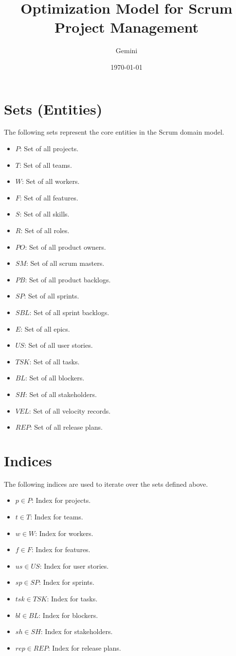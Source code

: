 \documentclass{article}
\title{Optimization Model for Scrum Project Management}
\author{Gemini}
\date{\today}
\begin{document}
\maketitle
\tableofcontents
\newpage

\section{Sets (Entities)}
The following sets represent the core entities in the Scrum domain model.
\begin{itemize}
    \item $P$: Set of all projects.
    \item $T$: Set of all teams.
    \item $W$: Set of all workers.
    \item $F$: Set of all features.
    \item $S$: Set of all skills.
    \item $R$: Set of all roles.
    \item $PO$: Set of all product owners.
    \item $SM$: Set of all scrum masters.
    \item $PB$: Set of all product backlogs.
    \item $SP$: Set of all sprints.
    \item $SBL$: Set of all sprint backlogs.
    \item $E$: Set of all epics.
    \item $US$: Set of all user stories.
    \item $TSK$: Set of all tasks.
    \item $BL$: Set of all blockers.
    \item $SH$: Set of all stakeholders.
    \item $VEL$: Set of all velocity records.
    \item $REP$: Set of all release plans.
\end{itemize}

\section{Indices}
The following indices are used to iterate over the sets defined above.
\begin{itemize}
    \item $p \in P$: Index for projects.
    \item $t \in T$: Index for teams.
    \item $w \in W$: Index for workers.
    \item $f \in F$: Index for features.
    \item $us \in US$: Index for user stories.
    \item $sp \in SP$: Index for sprints.
    \item $tsk \in TSK$: Index for tasks.
    \item $bl \in BL$: Index for blockers.
    \item $sh \in SH$: Index for stakeholders.
    \item $rep \in REP$: Index for release plans.
\end{itemize}
\end{document}
